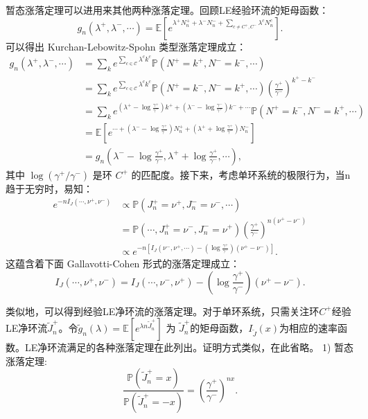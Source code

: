 暂态涨落定理可以进用来其他两种涨落定理。回顾LE经验环流的矩母函数：
\begin{equation*}
    g_n(\lambda^+,\lambda^-,\cdots)
    = \mathbb{E}\left[e^{\lambda^+N^+_n+\lambda^-N^-_n+\sum_{c\neq C^+,C^-}\lambda^cN^c_n}\right].
\end{equation*}
可以得出 Kurchan-Lebowitz-Spohn 类型涨落定理成立：
\begin{align*}
    g_n(\lambda^+,\lambda^-,\cdots)
    &= \sum_{k}e^{\sum_{c\in\mathcal{C}}\lambda^ck^c}\mathbb{P}\left(N^+=k^+,N^-=k^-,\cdots\right)\\
    &= \sum_{k}e^{\sum_{c\in\mathcal{C}}\lambda^ck^c}
    \mathbb{P}\left(N^+=k^-,N^-=k^+,\cdots\right) \left(\frac{\gamma^+}{\gamma^-}\right)^{k^+-k^-}\\
    &= \sum_{k}e^{\left(\lambda^+-\log\frac{\gamma^+}{\gamma^-}\right)k^++
    \left(\lambda^--\log\frac{\gamma^-}{\gamma^+}\right)k^-+\cdots}\mathbb{P}(N^+=k^-,N^-=k^+,\cdots)\\
    &= \mathbb{E}\left[e^{\cdots+\left(\lambda^--\log\frac{\gamma^+}{\gamma^-}\right)N^+_n+
    \left(\lambda^++\log\frac{\gamma^+}{\gamma^-}\right)N^-_n}\right]\\
    &= g_n\left(\lambda^--\log\frac{\gamma^+}{\gamma^-},
    \lambda^++\log\frac{\gamma^+}{\gamma^-},\cdots\right),
\end{align*}
其中 $\log(\gamma^+/\gamma^-)$ 是环 $C^+$ 的匹配度。接下来，考虑单环系统的极限行为，当n趋于无穷时，易知：
\begin{align*}
e^{-nI_J(\cdots,\nu^+,\nu^-)}
&\propto \mathbb{P}\left(J^+_n=\nu^+, J^-_n=\nu^-, \cdots\right)\\
&= \mathbb{P}\left(\cdots,J^+_n=\nu^-, J^-_n=\nu^+\right)
\left(\frac{\gamma^+}{\gamma^-}\right)^{n(\nu^+-\nu^-)}\\
&\propto e^{-n\left[I_J(\nu^-,\nu^+,\cdots)-\left(\log\frac{\gamma^+}{\gamma^-}\right)
(\nu^+-\nu^-)\right]}.
\end{align*}
这蕴含着下面 Gallavotti-Cohen 形式的涨落定理成立：
\begin{equation}\label{G-C type fluctuation}
    I_J(\cdots,\nu^+,\nu^-)=I_J(\cdots,\nu^-,\nu^+)-\left(\log\frac{\gamma^+}{\gamma^-}\right)(\nu^+-\nu^-).
\end{equation}

类似地，可以得到经验LE净环流的涨落定理。对于单环系统，只需关注环$C^+$经验LE净环流$\tilde{J}_n^+$。令$\tilde{g}_n(\lambda) = \mathbb{E}[e^{\lambda n\tilde{J}^+_n}]$ 为 $\tilde{J}^+_n$的矩母函数，$I_{\tilde{J}}(x)$为相应的速率函数。LE净环流满足的各种涨落定理在此列出。证明方式类似，在此省略。
1) 暂态涨落定理:
\begin{equation*}
\frac{\mathbb{P}(\tilde{J}^+_n=x)}{\mathbb{P}(\tilde{J}^+_n=-x)}
= \left(\frac{\gamma^+}{\gamma^-}\right)^{nx}.
\end{equation*}

